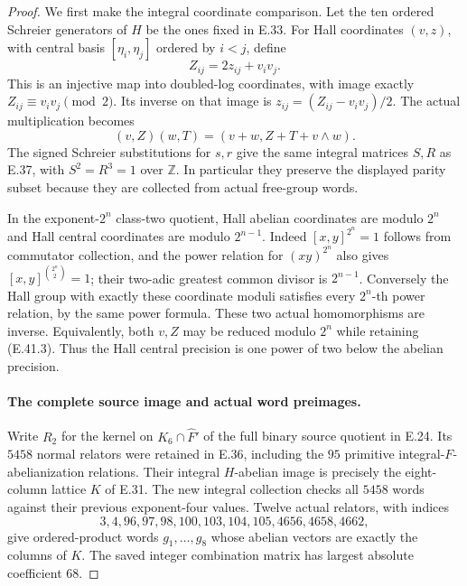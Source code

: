 \begin{proof}
We first make the integral coordinate comparison.
Let the ten ordered Schreier generators of $H$
be the ones fixed in E.33.
For Hall coordinates $(v,z)$, with central basis
$[\eta_i,\eta_j]$ ordered by $i<j$, define
\[
       Z_{ij}=2z_{ij}+v_i v_j.
 \tag{E.41.3}
\]
This is an injective map into doubled-log
coordinates, with image exactly
$Z_{ij}\equiv v_i v_j\pmod2$.
Its inverse on that image is
$z_{ij}=(Z_{ij}-v_i v_j)/2$.
The actual multiplication becomes
\[
             (v,Z)(w,T)=(v+w,Z+T+v\wedge w).
 \tag{E.41.4}
\]
The signed Schreier substitutions for $s,r$
give the same integral matrices $S,R$ as E.37,
with $S^2=R^3=1$ over $\mathbb Z$.
In particular they preserve the displayed
parity subset because they are collected from
actual free-group words.

In the exponent-$2^n$ class-two quotient, Hall
abelian coordinates are modulo $2^n$ and Hall
central coordinates are modulo $2^{n-1}$.
Indeed $[x,y]^{2^n}=1$ follows from commutator
collection, and the power relation for $(xy)^{2^n}$
also gives $[x,y]^{\binom{2^n}{2}}=1$;
their two-adic greatest common divisor is $2^{n-1}$.
Conversely the Hall group with exactly these
coordinate moduli satisfies every $2^n$-th power
relation, by the same power formula.
These two actual homomorphisms are inverse.
Equivalently, both $v,Z$ may be reduced modulo
$2^n$ while retaining \textup{(E.41.3)}.
Thus the Hall central precision is one power of
two below the abelian precision.

\paragraph{The complete source image and actual word preimages.}
Write $R_2$ for the kernel on
$K_6\cap\widehat F'$ of the full binary source
quotient in E.24.  Its $5458$ normal relators
were retained in E.36, including the $95$
primitive integral-$F$-abelianization relations.
Their integral $H$-abelian image is precisely
the eight-column lattice $K$ of E.31.
The new integral collection checks all $5458$
words against their previous exponent-four
values.  Twelve actual relators, with indices
\[
       3,4,96,97,98,100,103,104,105,4656,4658,4662,
 \tag{E.41.5}
\]
give ordered-product words $g_1,\ldots,g_8$
whose abelian vectors are exactly the columns
of $K$.  The saved integer combination matrix
has largest absolute coefficient $68$.


\end{proof}
